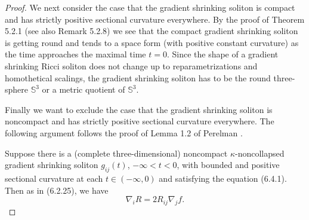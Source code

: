 \begin{proof}
We next consider the case that the gradient shrinking soliton is
compact and has strictly positive sectional curvature everywhere.
By the proof of Theorem 5.2.1 (see also Remark 5.2.8) we see that
the compact gradient shrinking soliton is getting round and tends
to a space form (with positive constant curvature) as the time
approaches the maximal time $t=0$. Since the shape of a gradient
shrinking Ricci soliton does not change up to reparametrizations
and homothetical scalings, the gradient shrinking soliton has to
be the round three-sphere $\mathbb{S}^3$ or a metric quotient of
$\mathbb{S}^3$.

Finally we want to exclude the case that the gradient shrinking
soliton is noncompact and has strictly positive sectional
curvature everywhere. The following argument follows the proof of
Lemma 1.2 of Perelman \cite{P2}.

Suppose there is a (complete three-dimensional) noncompact
$\kappa$-non\-collapsed gradient shrinking soliton $g_{ij}(t)$,
$-\infty<t<0$, with bounded and positive sectional curvature at
each $t\in (-\infty,0)$ and satisfying the equation (6.4.1). Then
as in (6.2.25), we have \begin{equation}
\nabla_iR=2R_{ij}\nabla_jf. %
\end{equation}


\end{proof}
